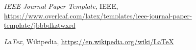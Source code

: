 \documentclass[journal]{IEEEtran}
\begin{document}
\appendices

\begin{thebibliography}{1}

\emph{IEEE Journal Paper Template}, IEEE, \url{https://www.overleaf.com/latex/templates/ieee-journal-paper-template/jbbbdkztwxrd}

\emph{LaTex}, Wikipedia, \url{https://en.wikipedia.org/wiki/LaTeX}

\end{thebibliography}
\end{document}
